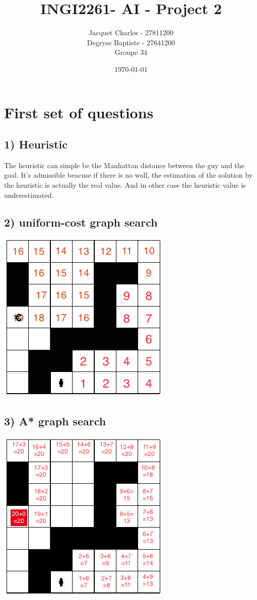 \documentclass[10pt]{report}
\title{INGI2261- AI - Project 2}
\author{Jacquet Charles - 27811200 \\ Degryse Baptiste - 27641200\\ Groupe 34}
\date\today
\begin{document}
\maketitle
\section*{First set of questions}
\subsection*{1) Heuristic}
The heuristic can simple be the Manhattan distance between the guy and the goal.
It's admissible beacuse if there is no wall, the estimation of the solution by the heuristic is actually the real value. And in other case the heuristic value is underestimated.

\subsection*{2) uniform-cost graph search}
\begin{center}
\includegraphics[scale=0.5]{uniform-cost.png}
\end{center}

\subsection*{3) A* graph search}
\begin{center}
\includegraphics[scale=0.5]{A_star.png}
\end{center}
\end{document}
